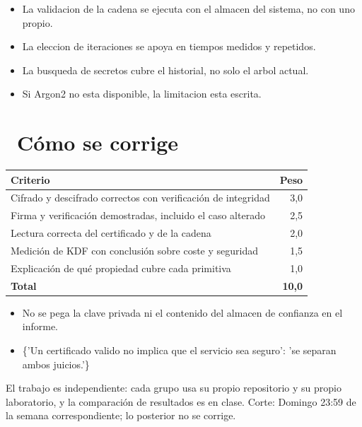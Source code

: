 \documentclass[11pt,a4paper]{article}
\newcommand{\iconotexto}[2]{\textcolor{cyanNeon}{\faIcon{#1}}~#2}
\begin{document}
\begin{itemize}[leftmargin=1.4em,itemsep=2pt,topsep=3pt]
  \item La validacion de la cadena se ejecuta con el almacen del sistema, no con uno propio.
  \item La eleccion de iteraciones se apoya en tiempos medidos y repetidos.
  \item La busqueda de secretos cubre el historial, no solo el arbol actual.
  \item Si Argon2 no esta disponible, la limitacion esta escrita.
\end{itemize}

\section{\iconotexto{ruler-combined}{Cómo se corrige}}

\begin{tabularx}{\linewidth}{@{}X r@{}}
\toprule
Criterio & Peso\\
\midrule
Cifrado y descifrado correctos con verificación de integridad & 3,0 \\
Firma y verificación demostradas, incluido el caso alterado & 2,5 \\
Lectura correcta del certificado y de la cadena & 2,0 \\
Medición de KDF con conclusión sobre coste y seguridad & 1,5 \\
Explicación de qué propiedad cubre cada primitiva & 1,0 \\
\midrule
\textbf{Total} & \textbf{10,0}\\
\bottomrule
\end{tabularx}

\begin{itemize}[leftmargin=1.4em,itemsep=2pt,topsep=3pt]
  \item No se pega la clave privada ni el contenido del almacen de confianza en el informe.
  \item \{'Un certificado valido no implica que el servicio sea seguro': 'se separan ambos juicios.'\}
\end{itemize}

\begin{cajaRecuerda}El trabajo es independiente: cada grupo usa su propio repositorio y su propio laboratorio, y la comparación de resultados es en clase. Corte: Domingo 23:59 de la semana correspondiente; lo posterior no se corrige.
\end{cajaRecuerda}
\end{document}
